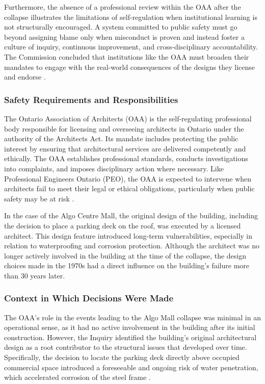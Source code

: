 \documentclass[12pt]{article}
\begin{document}
Furthermore, the absence of a professional review within the OAA after the collapse illustrates the limitations of self-regulation when institutional learning is not structurally encouraged. A system committed to public safety must go beyond assigning blame only when misconduct is proven and instead foster a culture of inquiry, continuous improvement, and cross-disciplinary accountability. The Commission concluded that institutions like the OAA must broaden their mandates to engage with the real-world consequences of the designs they license and endorse \cite[p393-398]{AlgoLakeReport1}.

\subsubsection*{Safety Requirements and Responsibilities}

The Ontario Association of Architects (OAA) is the self-regulating professional body responsible for licensing and overseeing architects in Ontario under the authority of the Architects Act. Its mandate includes protecting the public interest by ensuring that architectural services are delivered competently and ethically. The OAA establishes professional standards, conducts investigations into complaints, and imposes disciplinary action where necessary. Like Professional Engineers Ontario (PEO), the OAA is expected to intervene when architects fail to meet their legal or ethical obligations, particularly when public safety may be at risk \cite[p396-398]{AlgoLakeReport1}.

In the case of the Algo Centre Mall, the original design of the building, including the decision to place a parking deck on the roof, was executed by a licensed architect. This design feature introduced long-term vulnerabilities, especially in relation to waterproofing and corrosion protection. Although the architect was no longer actively involved in the building at the time of the collapse, the design choices made in the 1970s had a direct influence on the building's failure more than 30 years later.

\subsubsection*{Context in Which Decisions Were Made}

The OAA's role in the events leading to the Algo Mall collapse was minimal in an operational sense, as it had no active involvement in the building after its initial construction. However, the Inquiry identified the building's original architectural design as a root contributor to the structural issues that developed over time. Specifically, the decision to locate the parking deck directly above occupied commercial space introduced a foreseeable and ongoing risk of water penetration, which accelerated corrosion of the steel frame \cite[p396-397]{AlgoLakeReport1}.
\end{document}
